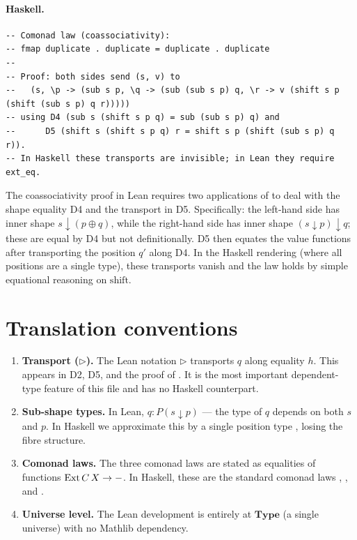 \documentclass[11pt,a4paper]{article}
\begin{document}
\paragraph{Haskell.}
\begin{lstlisting}[style=haskell]
-- Comonad law (coassociativity):
-- fmap duplicate . duplicate = duplicate . duplicate
--
-- Proof: both sides send (s, v) to
--   (s, \p -> (sub s p, \q -> (sub (sub s p) q, \r -> v (shift s p (shift (sub s p) q r)))))
-- using D4 (sub s (shift s p q) = sub (sub s p) q) and
--      D5 (shift s (shift s p q) r = shift s p (shift (sub s p) q r)).
-- In Haskell these transports are invisible; in Lean they require ext_eq.
\end{lstlisting}

\begin{fidelitynote}
The coassociativity proof in Lean requires two applications of 
to deal with the shape equality D4 and the transport in D5.  Specifically:
the left-hand side has inner shape $s \downarrow (p \oplus q)$, while the
right-hand side has inner shape $(s \downarrow p) \downarrow q$; these are
equal by D4 but not definitionally.  D5 then equates the value functions after
transporting the position $q'$ along D4.  In the Haskell rendering (where all
positions are a single type), these transports vanish and the law holds by
simple equational reasoning on $\mathrm{shift}$.
\end{fidelitynote}


\section{Translation conventions}

\begin{enumerate}
\item \textbf{Transport ($\triangleright$).}  The Lean notation  $\triangleright$ 
  transports $q$ along equality $h$.  This appears in D2, D5, and the proof
  of .  It is the most important dependent-type feature of
  this file and has no Haskell counterpart.

\item \textbf{Sub-shape types.}  In Lean, $q : P(s \downarrow p)$ --- the type
  of $q$ depends on both $s$ and $p$.  In Haskell we approximate this by a
  single position type , losing the fibre structure.

\item \textbf{Comonad laws.}  The three comonad laws are stated as equalities
  of functions $\mathrm{Ext}\,C\,X \to -$.  In Haskell, these are the standard
  comonad laws ,
  , and
  .

\item \textbf{Universe level.}  The Lean development is entirely at
  $\mathbf{Type}$ (a single universe) with no Mathlib dependency.
\end{enumerate}
\end{document}
